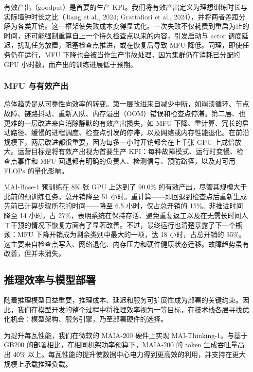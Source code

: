 \documentclass[
  10
]{article}
\begin{document}
有效产出（goodput）是首要的生产 KPI。我们将有效产出定义为理想训练时长与实际墙钟时长之比（Jiang et al., 2024; Grattafiori et al., 2024），并将两者差距分解为各类开销。这一框架使失败成本变得显式化。一次失败不仅耗费到重启为止的时间，还可能强制重算自上一个持久检查点以来的内容，引发启动与 actor 调度延迟，扰乱任务放置，阻塞检查点推进，或在恢复后导致 MFU 降低。同理，即使任务仍在运行，MFU 下降也会被当作生产事故处理，因为集群仍在消耗已分配的 GPU 小时数，而产出的训练进展低于预期。

\subsubsection{MFU 与有效产出}\label{mfu-and-goodput}

总体趋势是从可靠性向效率的转变。第一层改进来自减少中断，如崩溃循环、节点故障、链路抖动、重新入队、内存溢出（OOM）错误和检查点停滞。第二层、也更难的一层改进来自消除静默的有效产出损失，如 MFU 下降、重计算、冗长的启动路径、缓慢的进程调度、检查点引发的停滞，以及网络或内存性能退化。在前沿规模下，两层改进都很重要，因为每多一小时开销都会在上千张 GPU 上成倍放大。运营目标是将有效产出视为首要生产 KPI：每种故障模式、运行时变慢、检查点事件和 MFU 回退都有明确的负责人、检测信号、预防路径，以及对可用 FLOPs 的量化影响。

MAI-Base-1 预训练在 8K 张 GPU 上达到了 90.0\% 的有效产出，尽管其规模大于此前的预训练任务。总开销降至 51 小时。重计算——即回退到检查点后重新生成先前已计算步骤所花的时间——降至 6.5 小时，仅占总开销的 15\%。非推进时间降至 14 小时，占 27\%，表明系统在保持存活、避免重复返工以及在无需长时间人工干预的情况下恢复方面有了显著改善。不过，最终运行也清楚暴露了下一个瓶颈：MFU 下降开销成为剩余类别中最大的一项，达 18 小时，占总开销的 35\%。这主要来自检查点写入、网络退化、内存压力和硬件健康状态迁移。故障趋势虽有改善，但并未消失。

\subsection{推理效率与模型部署}\label{inference-efficiency-and-model-deployment}

随着推理模型日益重要，推理成本、延迟和服务可扩展性成为部署的关键约束。因此，我们在模型开发的整个过程中将推理效率视为一等目标，在技术栈各层寻找优化机会：模型架构、服务引擎，乃至部署硬件的选择。

为提升每瓦性能，我们在微软的 MAIA-200 硬件上实现 MAI-Thinking-1。与基于 GB200 的部署相比，在相同机架功率预算下，MAIA-200 的 token 生成吞吐量高出 40\% 以上。每瓦性能的提升使数据中心电力得到更高效的利用，并支持在更大规模上承载推理负载。
\end{document}
